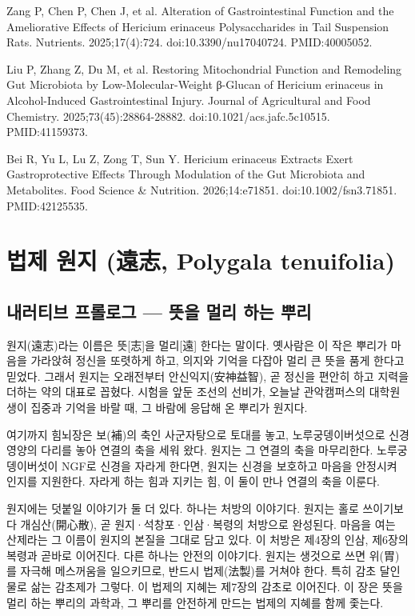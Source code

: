 \documentclass[12pt,oneside]{book}
\newcommand{\refend}{\endgroup\par}
\newcommand{\reff}[2]{\par\hangindent=7mm\hangafter=1\noindent[#1]\hspace{2mm}#2\par}
\begin{document}
\reff{64}{Zang P, Chen P, Chen J, et al. Alteration of Gastrointestinal Function and the Ameliorative Effects of Hericium erinaceus Polysaccharides in Tail Suspension Rats. Nutrients. 2025;17(4):724. doi:10.3390/nu17040724. PMID:40005052.}

\reff{65}{Liu P, Zhang Z, Du M, et al. Restoring Mitochondrial Function and Remodeling Gut Microbiota by Low-Molecular-Weight β-Glucan of Hericium erinaceus in Alcohol-Induced Gastrointestinal Injury. Journal of Agricultural and Food Chemistry. 2025;73(45):28864-28882. doi:10.1021/acs.jafc.5c10515. PMID:41159373.}

\reff{66}{Bei R, Yu L, Lu Z, Zong T, Sun Y. Hericium erinaceus Extracts Exert Gastroprotective Effects Through Modulation of the Gut Microbiota and Metabolites. Food Science \& Nutrition. 2026;14:e71851. doi:10.1002/fsn3.71851. PMID:42125535.}

\refend


\chapter{법제 원지 (遠志, Polygala tenuifolia)}

\section{내러티브 프롤로그 — 뜻을 멀리 하는 뿌리}

원지(遠志)라는 이름은 뜻[志]을 멀리[遠] 한다는 말이다. 옛사람은 이 작은 뿌리가 마음을 가라앉혀 정신을 또렷하게 하고, 의지와 기억을 다잡아 멀리 큰 뜻을 품게 한다고 믿었다. 그래서 원지는 오래전부터 안신익지(安神益智), 곧 정신을 편안히 하고 지력을 더하는 약의 대표로 꼽혔다. 시험을 앞둔 조선의 선비가, 오늘날 관악캠퍼스의 대학원생이 집중과 기억을 바랄 때, 그 바람에 응답해 온 뿌리가 원지다.

여기까지 힘뇌장은 보(補)의 축인 사군자탕으로 토대를 놓고, 노루궁뎅이버섯으로 신경영양의 다리를 놓아 연결의 축을 세워 왔다. 원지는 그 연결의 축을 마무리한다. 노루궁뎅이버섯이 NGF로 신경을 자라게 한다면, 원지는 신경을 보호하고 마음을 안정시켜 인지를 지원한다. 자라게 하는 힘과 지키는 힘, 이 둘이 만나 연결의 축을 이룬다.

원지에는 덧붙일 이야기가 둘 더 있다. 하나는 처방의 이야기다. 원지는 홀로 쓰이기보다 개심산(開心散), 곧 원지·석창포·인삼·복령의 처방으로 완성된다. 마음을 여는 산제라는 그 이름이 원지의 본질을 그대로 담고 있다. 이 처방은 제4장의 인삼, 제6장의 복령과 곧바로 이어진다. 다른 하나는 안전의 이야기다. 원지는 생것으로 쓰면 위(胃)를 자극해 메스꺼움을 일으키므로, 반드시 법제(法製)를 거쳐야 한다. 특히 감초 달인 물로 삶는 감초제가 그렇다. 이 법제의 지혜는 제7장의 감초로 이어진다. 이 장은 뜻을 멀리 하는 뿌리의 과학과, 그 뿌리를 안전하게 만드는 법제의 지혜를 함께 좇는다.
\end{document}
